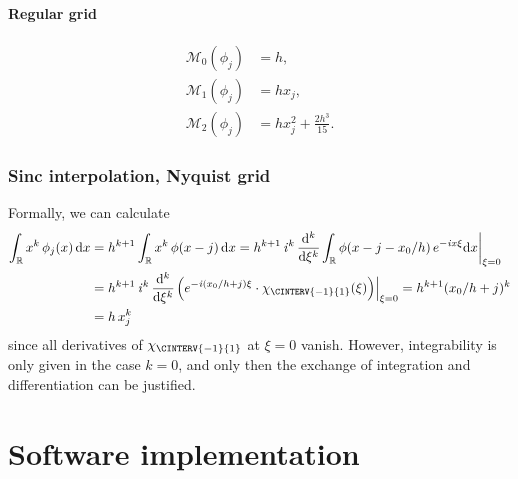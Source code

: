 \documentclass[a4paper]{paper}
\newcommand{\RR}{{\ensuremath{\mathbb{R}}}}
\newcommand*{\OP}[1]{{\ensuremath{\mathcal{#1}}}}
\newcommand*{\OPM}{\OP{M}}
\newcommand*{\FUNCRESTR}[2]{{\ensuremath{\left. \vphantom{g_{g_g}} {#1} \right|_{#2}}}}
\newcommand*{\I}{\ensuremath{\mathit{i}}}
\newcommand*{\D}{{\ensuremath{\mathrm{d}}}}
\begin{document}
\paragraph{Regular grid}

\begin{align*}
 \OPM_0(\phi_j) &= h, \\
 \OPM_1(\phi_j) &= h x_j, \\
 \OPM_2(\phi_j) &= h x_j^2 +  \frac{2h^3}{15}.
\end{align*}


\subsubsection{Sinc interpolation, Nyquist grid}
\label{subsubsec:specif:moments:sinc}

Formally, we can calculate
%
\begin{align*}
 \int_\RR x^k\, \phi_j(x)\, \D x 
 &= h^{k+1} \int_\RR x^k\, \phi(x-j)\, \D x 
 = h^{k+1}\, \I^k\, \frac{\D^k}{\D\xi^k} \FUNCRESTR{\int_\RR \phi(x-j-x_0/h)\, e^{-\I x \xi} \D x}{\xi=0} \\
 &= h^{k+1}\, \I^k\, \frac{\D^k}{\D\xi^k} \FUNCRESTR{\Big( e^{-\I (x_0/h + j) \xi} \cdot \chi_{\CINTERV{-1}{1}}(\xi) 
 \Big)}{\xi=0}
 = h^{k+1} (x_0/h + j)^k \\
 &= h\, x_j^k
\end{align*}
%
since all derivatives of $\chi_{\CINTERV{-1}{1}}$ at $\xi=0$ vanish. However, integrability is only given in the case 
$k=0$, and only then the exchange of integration and differentiation can be justified.





\section{Software implementation}
\label{sec:soft}
\end{document}
